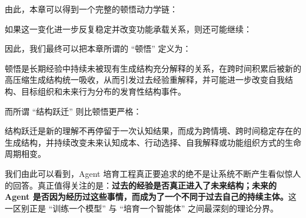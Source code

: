 由此，本章可以得到一个完整的顿悟动力学链：
\begin{statementbox}
\centering
{}
\end{statementbox}

如果这一变化进一步反复稳定并改变功能承载关系，则还可能继续：
\begin{statementbox}
\centering
{}
\end{statementbox}

因此，我们最终可以把本章所谓的 ``顿悟'' 定义为：

\begin{definition*}
顿悟是长期经验中持续未被现有生成结构充分解释的关系，在跨时间积累后被新的高压缩生成结构统一吸收，从而引发过去经验重解释，并可能进一步改变自我结构、目标组织和未来行为分布的发育性结构事件。
\end{definition*}

而所谓 ``结构跃迁'' 则比顿悟更严格：

\begin{statementbox}
结构跃迁是新的理解不再停留于一次认知结果，而成为跨情境、跨时间稳定存在的生成结构，并持续改变未来认知成本、行动选择、自我解释或功能组织方式的生命周期相变。
\end{statementbox}

我们由此可以看到，Agent 培育工程真正要追求的绝不是让系统不断产生看似惊人的回答。真正值得关注的是：\textbf{过去的经验是否真正进入了未来结构；未来的 Agent 是否因为经历过这些事情，而成为了一个不同于过去自己的持续主体。}这一区别正是 ``训练一个模型'' 与 ``培育一个智能体'' 之间最深刻的理论分界。
